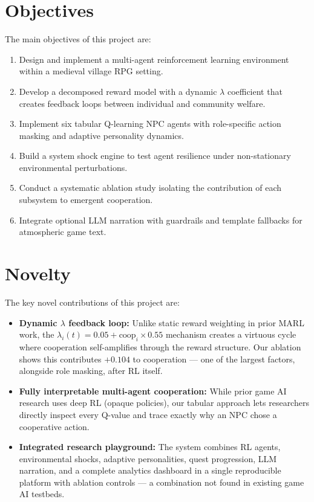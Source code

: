 \documentclass[12pt, a4paper, oneside]{report}
\begin{document}
\section{Objectives}
\label{sec:objectives}

The main objectives of this project are:

\begin{enumerate}
    \item Design and implement a multi-agent reinforcement learning environment within a medieval village RPG setting.
    \item Develop a decomposed reward model with a dynamic $\lambda$ coefficient that creates feedback loops between individual and community welfare.
    \item Implement six tabular Q-learning NPC agents with role-specific action masking and adaptive personality dynamics.
    \item Build a system shock engine to test agent resilience under non-stationary environmental perturbations.
    \item Conduct a systematic ablation study isolating the contribution of each subsystem to emergent cooperation.
    \item Integrate optional LLM narration with guardrails and template fallbacks for atmospheric game text.
\end{enumerate}

\section{Novelty}
\label{sec:novelty}

The key novel contributions of this project are:

\begin{itemize}
    \item \textbf{Dynamic $\lambda$ feedback loop:} Unlike static reward weighting in prior MARL work, the $\lambda_i(t) = 0.05 + \text{coop}_i \times 0.55$ mechanism creates a virtuous cycle where cooperation self-amplifies through the reward structure. Our ablation shows this contributes $+0.104$ to cooperation --- one of the largest factors, alongside role masking, after RL itself.
    \item \textbf{Fully interpretable multi-agent cooperation:} While prior game AI research uses deep RL (opaque policies), our tabular approach lets researchers directly inspect every Q-value and trace exactly why an NPC chose a cooperative action.
    \item \textbf{Integrated research playground:} The system combines RL agents, environmental shocks, adaptive personalities, quest progression, LLM narration, and a complete analytics dashboard in a single reproducible platform with ablation controls --- a combination not found in existing game AI testbeds.
\end{itemize}
\end{document}
